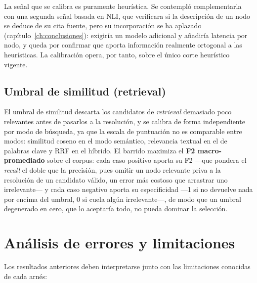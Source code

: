La señal que se calibra es puramente heurística. Se contempló complementarla con una segunda señal
basada en \acs{NLI}, que verificara si la descripción de un nodo se deduce de su cita fuente,
pero su incorporación se ha aplazado (capítulo~\ref{ch:conclusiones}): exigiría un modelo adicional
y añadiría latencia por nodo, y queda por confirmar que aporta información realmente ortogonal a las
heurísticas. La calibración opera, por tanto, sobre el único corte heurístico vigente.

\subsection{Umbral de similitud (retrieval)}

El umbral de similitud descarta los candidatos de \textit{retrieval} demasiado poco relevantes
antes de pasarlos a la resolución, y se calibra de forma independiente por modo de búsqueda, ya
que la escala de puntuación no es comparable entre modos: similitud coseno en el modo semántico,
relevancia textual en el de palabras clave y \ac{RRF} en el híbrido. El barrido maximiza el
\textbf{F2 macro-promediado} sobre el corpus: cada caso positivo aporta su F2 —que pondera el
\textit{recall} el doble que la precisión, pues omitir un nodo relevante priva a la resolución de un
candidato válido, un error más costoso que arrastrar uno irrelevante— y cada caso negativo aporta su
especificidad —1 si no devuelve nada por encima del umbral, 0 si cuela algún irrelevante—, de modo
que un umbral degenerado en cero, que lo aceptaría todo, no pueda dominar la selección.

\section{Análisis de errores y limitaciones}
\label{sec:analisis-errores}

Los resultados anteriores deben interpretarse junto con las limitaciones conocidas de cada
arnés:


